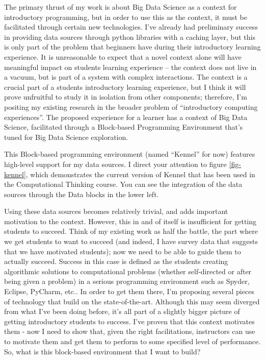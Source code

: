 \documentclass[onecolumn,12pt]{article}
\begin{document}
The primary thrust of my work is about Big Data Science as a context for introductory programming, but in order to use this as the context, it must be facilitated through certain new technologies.
I've already had preliminary success in providing data sources through python libraries with a caching layer, but this is only part of the problem that beginners have during their introductory learning experience.
It is unreasonable to expect that a novel context alone will have meaningful impact on students learning experience -- the context does not live in a vacuum, but is part of a system with complex interactions.
The context is a crucial part of a students introductory learning experience, but I think it will prove unfruitful to study it in isolation from other components; therefore, I'm positing my existing research in the broader problem of ``introductory computing experiences''.
The proposed experience for a learner has a context of Big Data Science, facilitated through a Block-based Programming Environment that's tuned for Big Data Science exploration.

This Block-based programming environment (named ``Kennel'' for now) features high-level support for my data sources.
I direct your attention to figure \ref{fig-kennel}, which demonstrates the current version of Kennel that has been used in the Computational Thinking course.
You can see the integration of the data sources through the Data blocks in the lower left.

Using these data sources becomes relatively trivial, and adds important motivation to the context.
However, this in and of itself is insufficient for getting students to succeed.
Think of my existing work as half the battle, the part where we get students to want to succeed (and indeed, I have survey data that suggests that we have motivated students); now we need to be able to guide them to actually succeed.
Success in this case is defined as the students creating algorithmic solutions to computational problems (whether self-directed or after being given a problem) in a serious programming environment such as Spyder, Eclipse, PyCharm, etc..
In order to get them there, I'm proposing several pieces of technology that build on the state-of-the-art.
Although this may seem diverged from what I've been doing before, it's all part of a slightly bigger picture of getting introductory students to success.
I've proven that this context motivates them - now I need to show that, given the right facilitations, instructors can use to motivate them and get them to perform to some specified level of performance.
So, what is this block-based environment that I want to build?
\end{document}
